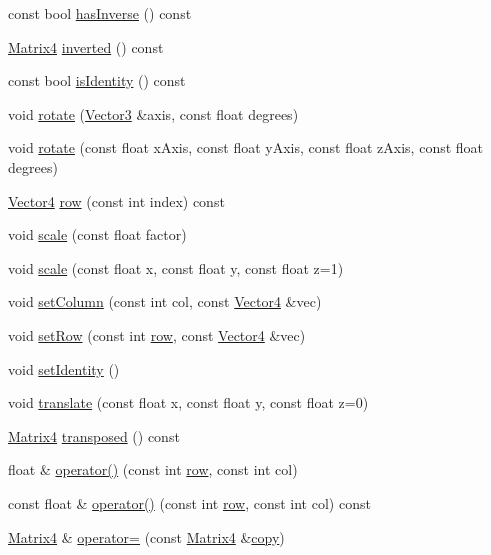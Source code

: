 \begin{DoxyCompactItemize}
\item 
const bool \hyperlink{classprism_1_1_matrix4_af9da747da374bbcb3c1eb86888445a04}{has\+Inverse} () const 
\item 
\hyperlink{classprism_1_1_matrix4}{Matrix4} \hyperlink{classprism_1_1_matrix4_a9fd394a4623bf877c816d3ee32a65398}{inverted} () const 
\item 
const bool \hyperlink{classprism_1_1_matrix4_a5e194c959cdab2ae9c0aa3a012aea3f5}{is\+Identity} () const 
\item 
void \hyperlink{classprism_1_1_matrix4_a069ba54a3d94b97ba73a067b677cb2dc}{rotate} (\hyperlink{classprism_1_1_vector3}{Vector3} \&axis, const float degrees)
\item 
void \hyperlink{classprism_1_1_matrix4_a633a54c0577f3119a5f27223df0945e4}{rotate} (const float x\+Axis, const float y\+Axis, const float z\+Axis, const float degrees)
\item 
\hyperlink{classprism_1_1_vector4}{Vector4} \hyperlink{classprism_1_1_matrix4_a3915b1b0eae6e7bd4aefcec1dd3d863a}{row} (const int index) const 
\item 
void \hyperlink{classprism_1_1_matrix4_a0157b4bb139f75e976ac56b33050c2f5}{scale} (const float factor)
\item 
void \hyperlink{classprism_1_1_matrix4_af25057a3429811c2bd0b2993fec88f30}{scale} (const float x, const float y, const float z=1)
\item 
void \hyperlink{classprism_1_1_matrix4_a06679d8db408ff8224f458f1043fb7d4}{set\+Column} (const int col, const \hyperlink{classprism_1_1_vector4}{Vector4} \&vec)
\item 
void \hyperlink{classprism_1_1_matrix4_a5c2b6f016995575308091c7e79554ea8}{set\+Row} (const int \hyperlink{classprism_1_1_matrix4_a3915b1b0eae6e7bd4aefcec1dd3d863a}{row}, const \hyperlink{classprism_1_1_vector4}{Vector4} \&vec)
\item 
void \hyperlink{classprism_1_1_matrix4_af1be8b0e450e975534b7c1bbedb2dadc}{set\+Identity} ()
\item 
void \hyperlink{classprism_1_1_matrix4_a641fbb2e58403f03f18295afac0a028a}{translate} (const float x, const float y, const float z=0)
\item 
\hyperlink{classprism_1_1_matrix4}{Matrix4} \hyperlink{classprism_1_1_matrix4_a69fd0bae9a82c8fd6ef6437c91f37fab}{transposed} () const 
\item 
float \& \hyperlink{classprism_1_1_matrix4_a6f273915f3e320cb7e8c75f32768a9e2}{operator()} (const int \hyperlink{classprism_1_1_matrix4_a3915b1b0eae6e7bd4aefcec1dd3d863a}{row}, const int col)
\item 
const float \& \hyperlink{classprism_1_1_matrix4_a98cf0e4d6df254f5c83076de8184a1f1}{operator()} (const int \hyperlink{classprism_1_1_matrix4_a3915b1b0eae6e7bd4aefcec1dd3d863a}{row}, const int col) const 
\item 
\hyperlink{classprism_1_1_matrix4}{Matrix4} \& \hyperlink{classprism_1_1_matrix4_aca7762ed30db088414734f5280695216}{operator=} (const \hyperlink{classprism_1_1_matrix4}{Matrix4} \&\hyperlink{namespaceprism_ae776f4cd825f79e7af1cf6ee1d90a209}{copy})
\end{DoxyCompactItemize}
